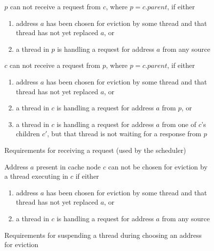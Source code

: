 \begin{figure}\small
\begin{requirement}
$p$ can not receive a request  from $c$, where $p = c.parent$,
if either
\begin{enumerate}
\item address $a$ has been chosen for eviction by some thread and that thread
has not yet replaced $a$, or
\item a thread in $p$ is handling a request for address
$a$ from any source
\end{enumerate}
\label{pHandleReq}
\end{requirement}
\begin{requirement}
$c$ can not receive a request  from $p$, where $p = c.parent$,
if either
\begin{enumerate}
\item address $a$ has been chosen for eviction by some thread and that thread
has not yet replaced $a$, or
\item a thread in $c$ is handling a request for address
$a$ from $p$, or
\item a thread in $c$ is handling a request for address
$a$ from one of $c$'s children $c'$, but that thread is not waiting for a
response from $p$
\end{enumerate}
\label{cHandleReq}
\end{requirement}
\caption{Requirements for receiving a request (used by the scheduler)}\label{recvReq}
\label{}
\end{figure}

\begin{figure}\small
\begin{requirement}
Address $a$ present in cache node $c$ can not be chosen for eviction by a thread
executing in $c$ if either
\begin{enumerate}
\item address $a$ has been chosen for eviction by some thread and that thread
has not yet replaced $a$, or
\item a thread in $c$ is handling a request for address
$a$ from any source
\end{enumerate}\label{evict}
\caption{Requirements for suspending a thread during choosing an address for eviction}
\end{requirement}
\end{figure}

